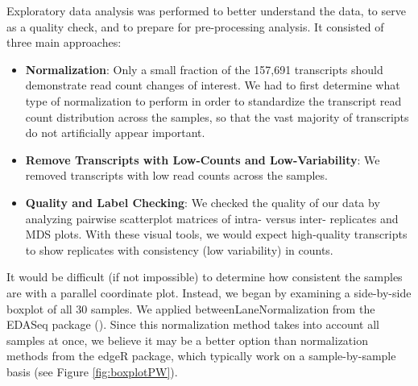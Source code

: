 \documentclass[11pt,a4paper,oldfontcommands,openany]{memoir}
\numberwithin{equation}{section} %
\begin{document}
Exploratory data analysis was performed to better understand the data, to serve as a quality check, and to prepare for pre-processing analysis. It consisted of three main approaches:

\begin{itemize}

\item \textbf{Normalization}: Only a small fraction of the 157,691 transcripts should demonstrate read count changes of interest. We had to first determine what type of normalization to perform in order to standardize the transcript read count distribution across the samples, so that the vast majority of transcripts do not artificially appear important.

\item \textbf{Remove Transcripts with Low-Counts and Low-Variability}: We removed transcripts with low read counts across the samples.

\item \textbf{Quality and Label Checking}: We checked the quality of our data by analyzing pairwise scatterplot matrices of intra- versus inter- replicates and MDS plots. With these visual tools, we would expect high-quality transcripts to show replicates with consistency (low variability) in counts.

\end{itemize}

It would be difficult (if not impossible) to determine how consistent the samples are with a parallel coordinate plot. Instead, we began by examining a side-by-side boxplot of all 30 samples. We applied betweenLaneNormalization from the EDASeq package (\citealt{edaseq}). Since this normalization method takes into account all samples at once, we believe it may be a better option than normalization methods from the edgeR package, which typically work on a sample-by-sample basis (see Figure \ref{fig:boxplotPW}).
\end{document}
